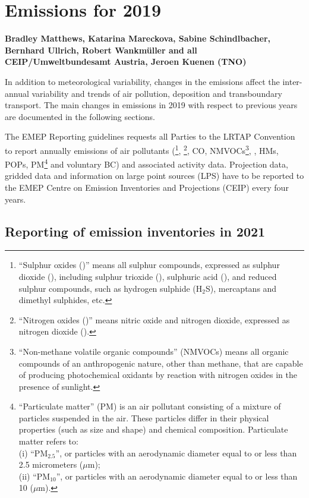 \chapter[Emissions 2019]{Emissions for 2019}
\label{ch:emis2019}


{\bf{Bradley Matthews, Katarina Mareckova, Sabine Schindlbacher, Bernhard Ullrich, Robert Wankm\"uller and all CEIP/Umweltbundesamt Austria, Jeroen Kuenen (TNO)}}
\vspace{30pt}

In addition to meteorological variability, changes in the emissions
affect the inter-annual variability and trends of air pollution,
deposition and transboundary transport.  
The main changes in emissions in 2019 with respect to previous years
are documented in the following sections.


The EMEP Reporting guidelines \citep{UNECE2014} requests all Parties
to the LRTAP Convention to report annually emissions of air pollutants
(\sox\footnote{``Sulphur oxides (\sox)'' means all sulphur compounds,
  expressed as sulphur dioxide (\soii), including sulphur trioxide
  (\soiii), sulphuric acid (\sulacid), and reduced sulphur compounds,
  such as hydrogen sulphide (H${_2}$S), mercaptans and dimethyl
  sulphides, etc.}, \noii\footnote{``Nitrogen oxides (\nox)'' means
  nitric oxide and nitrogen dioxide, expressed as nitrogen dioxide
  (\noii).}, CO, NMVOCs\footnote{``Non-methane volatile organic
  compounds'' (NMVOCs) means all organic compounds of an anthropogenic
  nature, other than methane, that are capable of producing
  photochemical oxidants by reaction with nitrogen oxides in the
  presence of sunlight.}, \nhiii, HMs, POPs,
PM\footnote{``Particulate matter'' (PM) is an air pollutant
  consisting of a mixture of particles suspended in the air. These
  particles differ in their physical properties (such as size and
  shape) and chemical composition. Particulate matter refers to:\\  
(i) ``PM$_{2.5}$'', or particles with an aerodynamic diameter equal to or
  less than 2.5 micrometers ($\mu$m);\\ 
(ii) ``PM$_{10}$'', or particles with an aerodynamic diameter equal to or
  less than 10 ($\mu$m).} and voluntary BC) and associated activity data. Projection data, gridded data and information on large point sources (LPS) 
have to be reported to the EMEP Centre on Emission Inventories and Projections (CEIP) every four years.

\section{Reporting of emission inventories in 2021}

